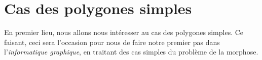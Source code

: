 \section{Cas des polygones simples}
\label{sec:polygones-simples}
En premier lieu, nous allons nous intéresser au cas des polygones simples.
Ce faisant, ceci sera l'occasion pour nous de faire notre premier pas dans l'\emph{informatique graphique},
en traitant des cas simples du problème de la morphose. 

